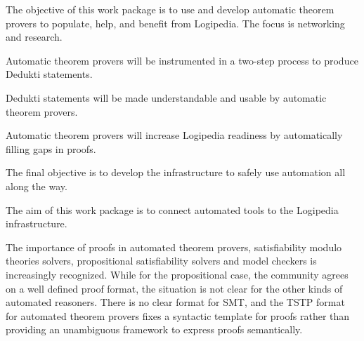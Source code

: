 \begin{workpackage}[id=atpetc,type=RTD,
  short={Automatic theorem provers},%
  title={Automatic theorem provers},
  lead=Sac,
  LieRM=48,
  InnRM=6,
  BelRM=12,
  SacRM=9,%
  ImtRM=9,%
  OcaRM=14,
  CeaRM=18,
  StuRM=0]


\begin{wpobjectives}
  The objective of this work package is to use and develop automatic
  theorem provers to populate, help, and benefit from Logipedia. The
  focus is networking and research.
  \begin{compactitem}
  \item Automatic theorem provers will be instrumented in a two-step
    process to produce Dedukti statements.
  \item Dedukti statements will be made understandable and usable by
    automatic theorem provers.
  \item Automatic theorem provers will increase Logipedia readiness by
    automatically filling gaps in proofs.
  \end{compactitem}
  The final objective is to develop the infrastructure to safely use automation
  all along the way.
\end{wpobjectives}


\begin{wpdescription}

  The aim of this work package is to connect automated tools to the Logipedia
  infrastructure.


The importance of proofs in automated theorem provers, satisfiability
modulo theories solvers, propositional satisfiability solvers and
model checkers is increasingly recognized.  While for the
propositional case, the community agrees on a well defined proof
format, the situation is not clear for the other kinds of automated
reasoners.  There is no clear format for SMT, and the TSTP format for
automated theorem provers fixes a syntactic template for proofs rather
than providing an unambiguous framework to express proofs
semantically.


\end{wpdescription}
\end{workpackage}
